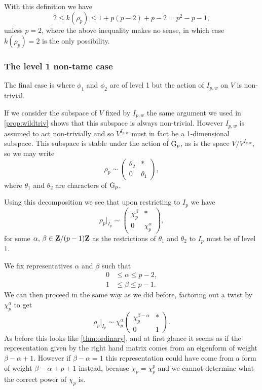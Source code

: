 \documentclass[a4paper,12pt]{article}
\begin{document}
With this definition we have
\[
2\le k(\rho_p) \le 1 + p(p-2) + p-2 = p^2 - p - 1,
\]
unless $p = 2$, where the above inequality makes no sense, in which case $k(\rho_p) = 2$ is the only possibility.


\subsubsection{The level 1 non-tame case}\label{sec:l1nt}
The final case is where $\phi_1$ and $\phi_2$ are of level 1 but the action of $I_{p,w}$ on $V$ is non-trivial.

If we consider the subspace of $V$ fixed by $I_{p,w}$ the same argument we used in \cref{prop:wildtriv} shows that this subspace is always non-trivial.
However $I_{p,w}$ is assumed to act non-trivially and so $V^{I_{p,w}}$ must in fact be a 1-dimensional subspace.
This subspace is stable under the action of $\mathrm{G}_p$, as is the space $V/V^{I_{p,w}}$, so we may write
\[
\rho_p \sim \begin{pmatrix}
\theta_2 & * \\
0        & \theta_1 \end{pmatrix},
\]
where $\theta_1$ and $\theta_2$ are characters of $\mathrm{G}_p$.

Using this decomposition we see that upon restricting to $I_p$ we have
\[
\rho_p|_{I_p} \sim \begin{pmatrix}
\chi_p^\beta & * \\
0          & \chi_p^\alpha \end{pmatrix},
\]
for some $\alpha,\,\beta \in \mathbf{Z}/(p-1)\mathbf{Z}$ as the restrictions of $\theta_1$ and $\theta_2$ to $I_p$ must be of level 1.

We fix representatives $\alpha$ and $\beta$ such that
\begin{align*}
0&\le \alpha \le p - 2,\\
1&\le \beta \le p - 1.
\end{align*}
We can then proceed in the same way as we did before,  factoring out a twist by $\chi_p^a$ to get
\[
\rho_p|_{I_{p}} \sim \chi_p^\alpha \begin{pmatrix}
\chi_p^{\beta - \alpha}& * \\
0        & 1 \end{pmatrix}.
\]
As before this looks like \cref{thm:ordinary}, and at first glance it seems as if the representation given by the right hand matrix comes from an eigenform of weight $\beta - \alpha + 1$.
However if $\beta - \alpha = 1$ this representation could have come from a form of weight $\beta - \alpha + p+1$ instead, because $\chi_p = \chi_p^{p}$ and we cannot determine what the correct power of $\chi_p$ is.
\end{document}
